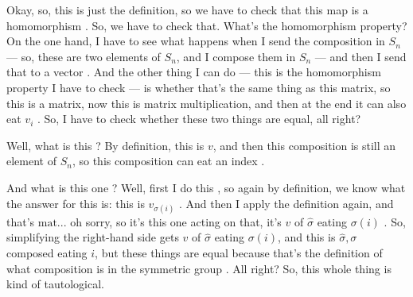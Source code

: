 \begin{speech}[00:10:48 - 00:12:46]
Okay, so, this is just the definition, so we have to check that this map is a homomorphism . So, we have to check that. What's the homomorphism property? On the one hand, I have to see what happens when I send the composition in $S_n$ --- so, these are two elements of $S_n$, and I compose them in $S_n$ --- and then I send that to a vector . And the other thing I can do --- this is the homomorphism property I have to check --- is whether that's the same thing as this matrix, so this is a matrix, now this is matrix multiplication, and then at the end it can also eat $v_i$ . So, I have to check whether these two things are equal, all right?

Well, what is this ? By definition, this is $v$, and then this composition is still an element of $S_n$, so this composition can eat an index .

And what is this one ? Well, first I do this , so again by definition, we know what the answer for this is: this is $v_{\sigma(i)}$ . And then I apply the definition again, and that's $\text{mat}$... oh sorry, so it's this one acting on that, it's $v$ of $\hat{\sigma}$ eating $\sigma(i)$ . So, simplifying the right-hand side gets $v$ of $\hat{\sigma}$ eating $\sigma(i)$, and this is $\hat{\sigma}, \sigma$ composed eating $i$, but these things are equal because that's the definition of what composition is in the symmetric group . All right? So, this whole thing is kind of tautological.
\end{speech}

